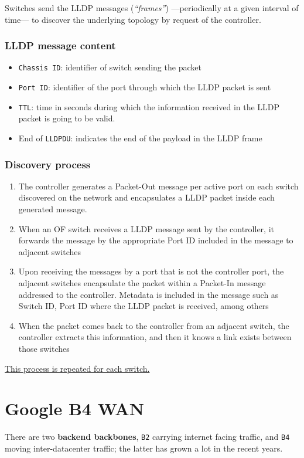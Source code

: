 Switches send the LLDP messages (\textit{``frames''}) ---periodically at a given interval of time--- to discover the underlying topology by request of the controller.

\subsubsection{LLDP message content}
\begin{itemize}
   \item \texttt{Chassis ID}: identifier of switch sending the packet
   \item \texttt{Port ID}: identifier of the port through which the LLDP packet is sent
   \item \texttt{TTL}: time in seconds during which the information received in the LLDP
   packet is going to be valid.
   \item End of \texttt{LLDPDU}: indicates the end of the payload in the LLDP frame
\end{itemize}

\subsubsection{Discovery process}
\begin{enumerate}
   \item The controller generates a Packet-Out message per active port on each switch discovered on the network and encapsulates a LLDP packet inside each generated message.
   \item When an OF switch receives a LLDP message sent by the controller, it forwards the message by the appropriate Port ID included in the message to adjacent switches
   \item Upon receiving the messages by a port that is not the controller port, the adjacent switches encapsulate the packet within a Packet-In message addressed to the controller. Metadata is included in the message such as Switch ID, Port ID where the LLDP packet is received, among others
   \item When the packet comes back to the controller from an adjacent switch, the controller extracts this information, and then it knows a link exists between those switches
\end{enumerate}
\ul{This process is repeated for each switch.}

\section{Google B4 WAN}
There are two \textbf{backend backbones}, \texttt{B2} carrying internet facing traffic, and \texttt{B4} moving inter-datacenter traffic; the latter has grown a lot in the recent years.

